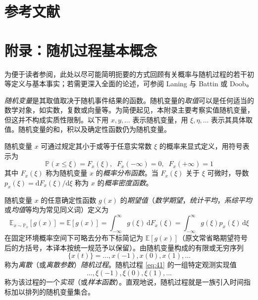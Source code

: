\section{参考文献}\label{sec:refs}




\section{附录：随机过程基本概念}\label{sec:appendix}

为便于读者参阅，此处以尽可能简明扼要的方式回顾有关概率与随机过程的若干初等定义与基本事实；若需更深入全面的论述，可参阅 Laning 与 Battin\cite{r05} 或 Doob\cite{r15}。

\emph{随机变量}是其取值取决于随机事件结果的函数。随机变量的\emph{取值}可以是任何适当的数学对象，如实数，复数或向量等。为简便起见，本附录主要考察实值随机变量，但这并不构成实质性限制。以下用 $x, y, \dots$ 表示随机变量，用 $\xi, \eta, \dots$ 表示其具体取值。随机变量的和，积以及确定性函数仍为随机变量。

随机变量 $x$ 可通过规定其小于或等于任意实常数 $\xi$ 的概率来显式定义，用符号表示为
\begin{equation*}
\mathbb{P}(x \leq \xi) = F_x(\xi), \;\; F_x(-\infty) = 0, \;\; F_x(+\infty) = 1
\end{equation*}
其中 $F_x(\xi)$ 称为随机变量 $x$ 的\emph{概率分布函数}。当 $F_x(\xi)$ 关于 $\xi$ 可微时，导数 $p_x(\xi) = \mathrm{d}F_x(\xi) / \mathrm{d}\xi$ 称为 $x$ 的\emph{概率密度函数}。

随机变量 $x$ 的任意确定性函数 $g(x)$ 的\emph{期望值}（\emph{数学期望}，\emph{统计平均}，\emph{系综平均}或\emph{均值}等均为常见同义词）定义为
\begin{equation}\label{eq:40}
\mathbb{E}_{x \sim \mathbb{P}_x}[g(x)] = \mathbb{E}[g(x)] = \int_{-\infty}^{\infty} g(\xi)\,\mathrm{d}F_x(\xi) = \int_{-\infty}^{\infty} g(\xi)p_x(\xi)\,\mathrm{d}\xi
\end{equation}
在固定环境概率空间下可略去分布下标简记为 $\mathbb{E}[g(x)]$（原文常省略期望符号后的方括号，本译本按统一规范予以保留）。由随机变量构成的有限或无穷序列
\begin{equation}\label{eq:41}
\{x(t)\} = \dots, x(-1), x(0), x(1), \dots
\end{equation}
称为\emph{离散}（或\emph{离散参数}）\emph{随机过程}。随机过程 \eqref{eq:41} 的一组特定观测实现值
\begin{equation*}
\dots, \xi(-1), \xi(0), \xi(1), \dots
\end{equation*}
称为该过程的一个\emph{实现}（或\emph{样本函数}）。直观地说，随机过程就是一族引入时间指标加以排列的随机变量集合。


